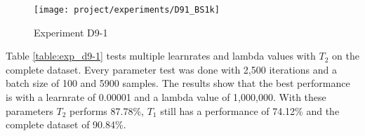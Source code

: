 \begin{figure}[H]
    \centering
    \texttt{[image: project/experiments/D91\_BS1k]}
    \caption{Experiment D9-1}
    \label{fig:exp_d9-1_bs1k}
\end{figure}

\newpage

Table \ref{table:exp_d9-1} tests multiple learnrates and lambda values with $T_2$ on the complete dataset.
Every parameter test was done with 2,500 iterations and a batch size of 100 and 5900 samples.
\newline
The results show that the best performance is with a learnrate of 0.00001 and a lambda value of 1,000,000.
With these parameters $T_2$ performs 87.78\%, $T_1$ still has a performance of 74.12\% and the complete dataset of 90.84\%.

